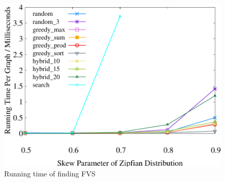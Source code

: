 \begin{figure}[t]
        \centering
        \includegraphics[width=.4\textwidth]{./exp_fig/fvs/latency}
        \caption{Running time of finding FVS}
        \label{fig:fvs:latency}
\end{figure}


